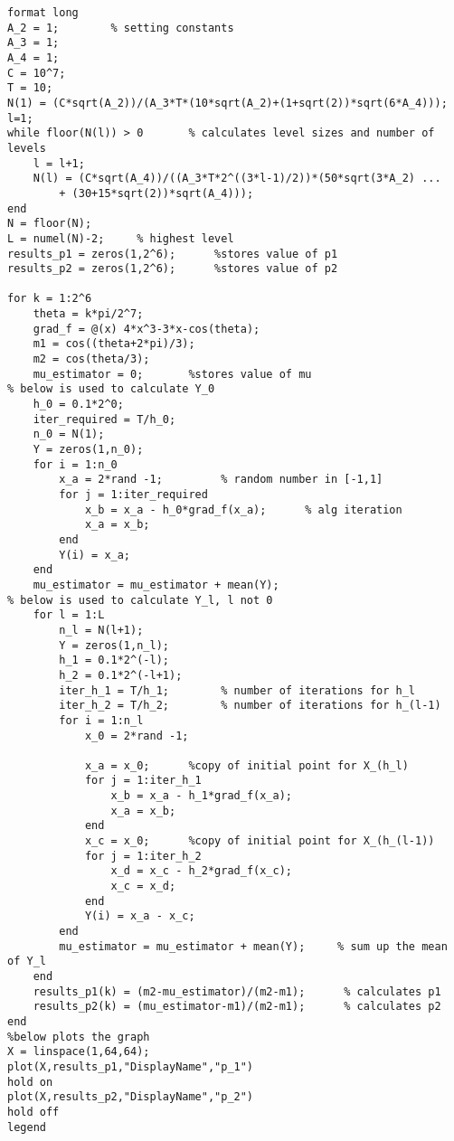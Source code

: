 \lstset{basicstyle=\footnotesize,style=myCustomMatlabStyle}
\begin{lstlisting}
format long
A_2 = 1;        % setting constants
A_3 = 1;
A_4 = 1;
C = 10^7;
T = 10;
N(1) = (C*sqrt(A_2))/(A_3*T*(10*sqrt(A_2)+(1+sqrt(2))*sqrt(6*A_4)));
l=1;
while floor(N(l)) > 0       % calculates level sizes and number of levels
    l = l+1;
    N(l) = (C*sqrt(A_4))/((A_3*T*2^((3*l-1)/2))*(50*sqrt(3*A_2) ...
        + (30+15*sqrt(2))*sqrt(A_4)));    
end
N = floor(N);
L = numel(N)-2;     % highest level
results_p1 = zeros(1,2^6);      %stores value of p1
results_p2 = zeros(1,2^6);      %stores value of p2

for k = 1:2^6
    theta = k*pi/2^7;
    grad_f = @(x) 4*x^3-3*x-cos(theta);
    m1 = cos((theta+2*pi)/3);
    m2 = cos(theta/3);
    mu_estimator = 0;       %stores value of mu
% below is used to calculate Y_0    
    h_0 = 0.1*2^0;
    iter_required = T/h_0;
    n_0 = N(1);       
    Y = zeros(1,n_0);
    for i = 1:n_0
        x_a = 2*rand -1;         % random number in [-1,1]
        for j = 1:iter_required
            x_b = x_a - h_0*grad_f(x_a);      % alg iteration
            x_a = x_b;
        end
        Y(i) = x_a;
    end
    mu_estimator = mu_estimator + mean(Y);
% below is used to calculate Y_l, l not 0
    for l = 1:L
        n_l = N(l+1);        
        Y = zeros(1,n_l);        
        h_1 = 0.1*2^(-l);
        h_2 = 0.1*2^(-l+1);
        iter_h_1 = T/h_1;        % number of iterations for h_l
        iter_h_2 = T/h_2;        % number of iterations for h_(l-1)
        for i = 1:n_l
            x_0 = 2*rand -1;         
         
            x_a = x_0;      %copy of initial point for X_(h_l)
            for j = 1:iter_h_1
                x_b = x_a - h_1*grad_f(x_a);      
                x_a = x_b;
            end
            x_c = x_0;      %copy of initial point for X_(h_(l-1))
            for j = 1:iter_h_2
                x_d = x_c - h_2*grad_f(x_c);      
                x_c = x_d;
            end
            Y(i) = x_a - x_c;
        end
        mu_estimator = mu_estimator + mean(Y);     % sum up the mean of Y_l
    end
    results_p1(k) = (m2-mu_estimator)/(m2-m1);      % calculates p1
    results_p2(k) = (mu_estimator-m1)/(m2-m1);      % calculates p2
end
%below plots the graph
X = linspace(1,64,64);
plot(X,results_p1,"DisplayName","p_1")
hold on
plot(X,results_p2,"DisplayName","p_2")
hold off
legend
\end{lstlisting}
